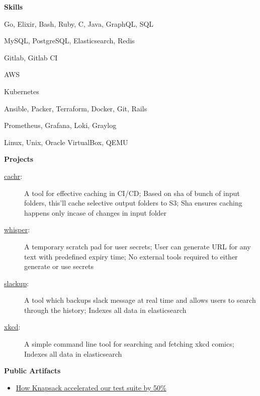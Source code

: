 \documentclass[letterpaper,11pt]{article}
\newcommand{\resitem}[1]{\item #1 \vspace{-2pt}}
\newcommand{\resheading}[1]{{\large \colorbox{mygrey}{\begin{minipage}{\textwidth}{\textbf{#1 \vphantom{p\^{E}}}}\end{minipage}}}}
\begin{document}
\resheading{Skills}
	\begin{description}[noitemsep]
		\item[Languages:] { \footnotesize Go, Elixir, Bash, Ruby, C, Java, GraphQL, SQL}
		\item[Databases:] { \footnotesize MySQL, PostgreSQL, Elasticsearch, Redis}
    \item[CI/CD:] { \footnotesize Gitlab, Gitlab CI}
    \item[Cloud Providers:] { \footnotesize AWS }
    \item[Container Orchestration:] { \footnotesize Kubernetes }
    \item[Tools/Frameworks:] { \footnotesize Ansible, Packer, Terraform, Docker, Git, Rails }
    \item[Logging/Monitoring:] { \footnotesize Prometheus, Grafana, Loki, Graylog }
    \item[OS:] { \footnotesize Linux, Unix, Oracle VirtualBox, QEMU }
	\end{description} %

\resheading{Projects}

\begin{description}
  \item[{\href{https://github.com/ms-choudhary/cachr}{cachr}}:] { \footnotesize A tool for effective caching in CI/CD; Based on sha of bunch of input folders, this'll cache selective output folders to S3; Sha ensures caching happens only incase of changes in input folder }
\item[{\href{https://github.com/ms-choudhary/whisper}{whisper}}:] { \footnotesize A temporary scratch pad for user secrets; User can generate URL for any text with predefined expiry time; No external tools required to either generate or use secrets  }
\item[{\href{https://github.com/ms-choudhary/slackup}{slackup}}:] { \footnotesize A tool which backups slack message at real time and allows users to search through the history; Indexes all data in elasticsearch}
\item[{\href{https://github.com/ms-choudhary/xkcd}{xkcd}}:] { \footnotesize A simple command line tool for searching and fetching xkcd comics; Indexes all data in elasticsearch }
\end{description}

\resheading{Public Artifacts}

\begin{itemize}
  \resitem{\footnotesize \href{https://medium.com/scripbox-engineering/how-knapsack-accelerated-our-test-suite-by-50-42f8cb584c47}{How Knapsack accelerated our test suite by 50\%}}
\end{itemize}
\end{document}
